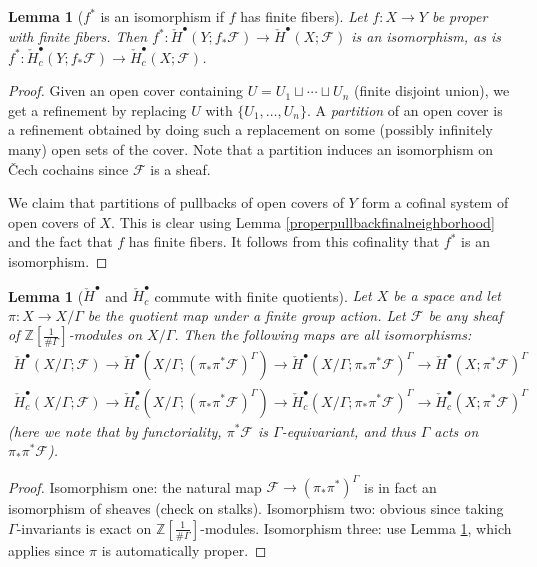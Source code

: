 \documentclass[12pt]{article}
\newtheorem{lemma}[theorem]{Lemma}
\theoremstyle{definition}
\theoremstyle{remark}
\numberwithin{equation}{subsection}
\newcommand{\F}{\mathcal F}
\newcommand{\ZZ}{\mathbb Z}
\newcommand{\cH}{\check H}
\begin{document}
\begin{lemma}[$f^\ast$ is an isomorphism if $f$ has finite fibers]\label{finitemap}
Let $f:X\to Y$ be proper with finite fibers.  Then $f^\ast:\cH^\bullet(Y;f_\ast\F)\to\cH^\bullet(X;\F)$ is an isomorphism, as is $f^\ast:\cH^\bullet_c(Y;f_\ast\F)\to\cH^\bullet_c(X;\F)$.
\end{lemma}

\begin{proof}
Given an open cover containing $U=U_1\sqcup\cdots\sqcup U_n$ (finite disjoint union), we get a refinement by replacing $U$ with $\{U_1,\ldots,U_n\}$.  A \emph{partition} of an open cover is a refinement obtained by doing such a replacement on some (possibly infinitely many) open sets of the cover.  Note that a partition induces an isomorphism on \v Cech cochains since $\F$ is a sheaf.

We claim that partitions of pullbacks of open covers of $Y$ form a cofinal system of open covers of $X$.  This is clear using Lemma \ref{properpullbackfinalneighborhood} and the fact that $f$ has finite fibers.  It follows from this cofinality that $f^\ast$ is an isomorphism.
\end{proof}

\begin{lemma}[$\cH^\bullet$ and $\cH^\bullet_c$ commute with finite quotients]\label{cechcohomologyfinitequotient}
Let $X$ be a space and let $\pi:X\to X/\Gamma$ be the quotient map under a finite group action.  Let $\F$ be any sheaf of $\ZZ[\frac 1{\#\Gamma}]$-modules on $X/\Gamma$.  Then the following maps are all isomorphisms:
\begin{align*}%
\cH^\bullet(X/\Gamma;\F)\to\cH^\bullet(X/\Gamma;(\pi_\ast\pi^\ast\F)^\Gamma)\to\cH^\bullet(X/\Gamma;\pi_\ast\pi^\ast\F)^\Gamma\to\cH^\bullet(X;\pi^\ast\F)^\Gamma\\
\cH^\bullet_c(X/\Gamma;\F)\to\cH^\bullet_c(X/\Gamma;(\pi_\ast\pi^\ast\F)^\Gamma)\to\cH^\bullet_c(X/\Gamma;\pi_\ast\pi^\ast\F)^\Gamma\to\cH^\bullet_c(X;\pi^\ast\F)^\Gamma
\end{align*}
(here we note that by functoriality, $\pi^\ast\F$ is $\Gamma$-equivariant, and thus $\Gamma$ acts on $\pi_\ast\pi^\ast\F$).
\end{lemma}

\begin{proof}
Isomorphism one: the natural map $\F\to(\pi_\ast\pi^\ast)^\Gamma$ is in fact an isomorphism of sheaves (check on stalks).  Isomorphism two: obvious since taking $\Gamma$-invariants is exact on $\ZZ[\frac 1{\#\Gamma}]$-modules.  Isomorphism three: use Lemma \ref{finitemap}, which applies since $\pi$ is automatically proper.
\end{proof}
\end{document}
